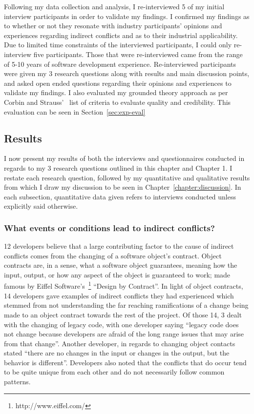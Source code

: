 Following my data collection and analysis, I re-interviewed 5 of my initial interview participants
in order to validate my findings. I confirmed my findings as to whether or not they resonate with 
industry participants' opinions and experiences regarding indirect conflicts and as to their industrial 
applicability. Due to limited time constraints of the interviewed participants, I could only re-interview
five participants. Those that were re-interviewed came from the range of 5-10 years of software development
experience. Re-interviewed participants were given my 3 research questions along with results and main
discussion points, and asked open ended questions regarding their opinions and experiences to validate my 
findings. I also evaluated my grounded theory approach as per Corbin and Strauss'~\cite{Corbin:1998:SP}
list of criteria to evaluate quality and credibility. This evaluation can be seen in Section~\ref{sec:exp-eval}

\subsection{Results}
\label{sec:exp-results}

I now present my results of both the interviews and questionnaires conducted in regards to my 3 research questions
outlined in this chapter and Chapter 1. I restate each research question, followed by my quantitative and qualitative
results from which I draw my discussion to be seen in Chapter~\ref{chapter:discussion}. In each subsection, quantitative data
given refers to interviews conducted unless explicitly said otherwise.

\subsubsection{What events or conditions lead to indirect conflicts?}

12 developers believe that a large contributing factor to the cause
of indirect conflicts comes from the changing of a software object's contract. Object contracts are, in a sense,
what a software object guarantees, meaning how the input, output, or how any aspect of the object is guaranteed
to work; made famous by Eiffel Software's~\footnote{http://www.eiffel.com/} ``Design by Contract''\texttrademark.
In light of object contracts, 14 developers gave examples of indirect conflicts they had experienced
which stemmed from not understanding the far reaching ramifications of a change being made to an object contract
towards the rest of the project. Of those 14, 3 dealt
with the changing of legacy code, with one developer saying ``legacy code does not change because developers
are afraid of the long range issues that may arise from that change''. Another developer, in regards to changing
object contacts stated ``there are no changes in the input or changes in the output, but the behavior is different''.
Developers also noted that the conflicts that do occur tend to be quite unique from each other and do not necessarily
follow common patterns.

